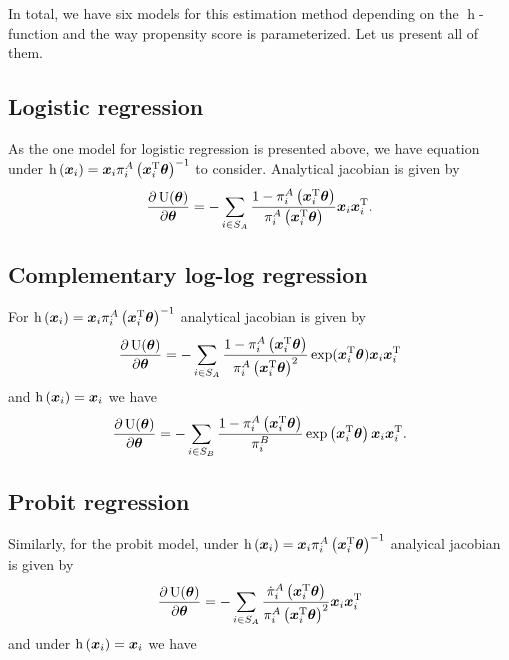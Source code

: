 \documentclass[
  letterpaper,
  DIV=11,
  numbers=noendperiod]{scrreprt}
\begin{document}
In total, we have six models for this estimation method depending on the
\(\operatorname{h}\)-function and the way propensity score is
parameterized. Let us present all of them.

\hypertarget{logistic-regression-1}{%
\subsection{Logistic regression}\label{logistic-regression-1}}

As the one model for logistic regression is presented above, we have
equation under
\(\operatorname{h}\left(\boldsymbol{x}_i\right) = \boldsymbol{x}_i \pi_i^A\left(\boldsymbol{x}_i^{\mathrm{T}} \boldsymbol{\theta} \right)^{-1}\)
to consider. Analytical jacobian is given by \[
    \frac{\partial \operatorname{U}(\boldsymbol{\theta})}{\partial \boldsymbol{\theta}} = -\sum_{i \in S_A} \frac{1 - \pi_i^A\left(\boldsymbol{x}_i^{\mathrm{T}} \boldsymbol{\theta} \right)}{\pi_i^A\left(\boldsymbol{x}_i^{\mathrm{T}} \boldsymbol{\theta} \right)} \boldsymbol{x}_i \boldsymbol{x}_i^{\mathrm{T}}.
\]

\hypertarget{complementary-log-log-regression-1}{%
\subsection{Complementary log-log
regression}\label{complementary-log-log-regression-1}}

For
\(\operatorname{h}\left(\boldsymbol{x}_i\right) = \boldsymbol{x}_i \pi_i^A\left(\boldsymbol{x}_i^{\mathrm{T}} \boldsymbol{\theta} \right)^{-1}\)
analytical jacobian is given by \[
    \frac{\partial \operatorname{U}(\boldsymbol{\theta})}{\partial \boldsymbol{\theta}} = - \sum_{i \in S_A} \frac{1 - \pi_i^A\left(\boldsymbol{x}_i^{\mathrm{T}} \boldsymbol{\theta} \right)}{\pi_i^A\left(\boldsymbol{x}_i^{\mathrm{T}} \boldsymbol{\theta} \right)^2} \exp(\boldsymbol{x}_i^{\mathrm{T}} \boldsymbol{\theta}) \boldsymbol{x}_i \boldsymbol{x}_i^{\mathrm{T}}
\] and \(\operatorname{h}\left(\boldsymbol{x}_i\right) = \boldsymbol{x}_i\) we have \[
    \frac{\partial \operatorname{U}(\boldsymbol{\theta})}{\partial \boldsymbol{\theta}} = - \sum_{i \in S_B} \frac{1 - \pi_i^A\left(\boldsymbol{x}_i^{\mathrm{T}} \boldsymbol{\theta} \right)}{\pi_i^B} \exp \left(\boldsymbol{x}_i^\mathrm{T} \boldsymbol{\theta}\right) \boldsymbol{x}_i \boldsymbol{x}_i^{\mathrm{T}}.
\]

\hypertarget{probit-regression-1}{%
\subsection{Probit regression}\label{probit-regression-1}}

Similarly, for the probit model, under
\(\operatorname{h}\left(\boldsymbol{x}_i\right) = \boldsymbol{x}_i \pi_i^A\left(\boldsymbol{x}_i^{\mathrm{T}} \boldsymbol{\theta} \right)^{-1}\)
analyical jacobian is given by \[
    \frac{\partial \operatorname{U}(\boldsymbol{\theta})}{\partial \boldsymbol{\theta}} = - \sum_{i \in S_A} \frac{\dot{\pi}_i^A\left(\boldsymbol{x}_i^{\mathrm{T}} \boldsymbol{\theta} \right)}{\pi_i^A\left(\boldsymbol{x}_i^{\mathrm{T}} \boldsymbol{\theta} \right)^2} \boldsymbol{x}_i \boldsymbol{x}_i^{\mathrm{T}}
\] and under \(\operatorname{h}\left(\boldsymbol{x}_i\right) = \boldsymbol{x}_i\) we have
\end{document}
